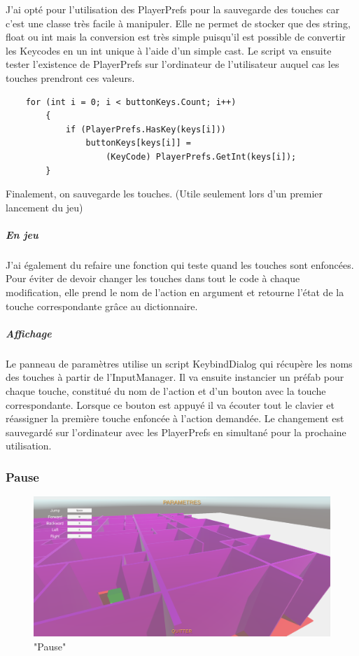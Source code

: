 \documentclass{article}
\begin{document}
J'ai opté pour l'utilisation des PlayerPrefs pour la sauvegarde des touches car c'est une classe très facile à manipuler. Elle ne permet de stocker que des string, float ou int mais la conversion est très simple puisqu'il est possible de convertir les Keycodes en un int unique à l'aide d'un simple cast.
\newline Le script va ensuite tester l'existence de PlayerPrefs sur l'ordinateur de l'utilisateur auquel cas les touches prendront ces valeurs.

\par\vspace{0.2cm}
\begin{lstlisting}
    for (int i = 0; i < buttonKeys.Count; i++)
        {
            if (PlayerPrefs.HasKey(keys[i]))
                buttonKeys[keys[i]] = 
                    (KeyCode) PlayerPrefs.GetInt(keys[i]);
        }
\end{lstlisting}

Finalement, on sauvegarde les touches. (Utile seulement lors d'un premier lancement du jeu)

\subparagraph{En jeu}
J'ai également du refaire une fonction qui teste quand les touches sont enfoncées. Pour éviter de devoir changer les touches dans tout le code à chaque modification, elle prend le nom de l'action en argument et retourne l'état de la touche correspondante grâce au dictionnaire.

\subparagraph{Affichage}
Le panneau de paramètres utilise un script KeybindDialog qui récupère les noms des touches à partir de l'InputManager. Il va ensuite instancier un préfab pour chaque touche, constitué du nom de l'action et d'un bouton avec la touche correspondante. Lorsque ce bouton est appuyé il va écouter tout le clavier et réassigner la première touche enfoncée à l'action demandée. Le changement est sauvegardé sur l'ordinateur avec les PlayerPrefs en simultané pour la prochaine utilisation.

\subsubsection{Pause}

\par\vspace{0.5cm}
\begin{figure}[!h]
    \centering
    \includegraphics[width=1\textwidth]{Pause.PNG}
    \caption{"Pause"}
    \label{Pause}
\end{figure}{}
\end{document}
